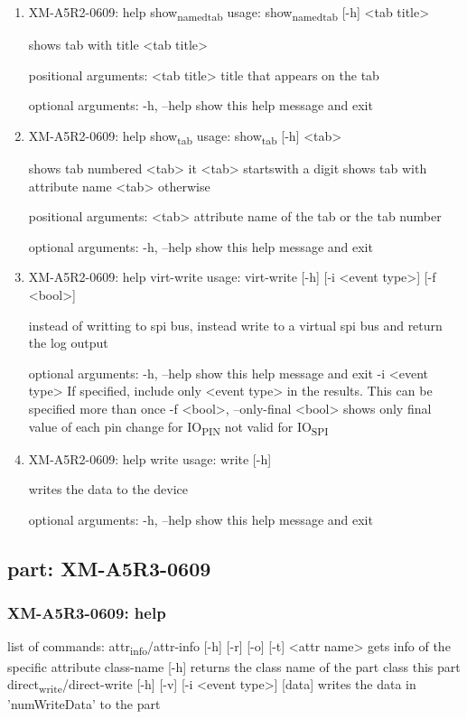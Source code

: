 \documentclass[11pt]{article}
\begin{document}
\begin{enumerate}
\item XM-A5R2-0609: help show\textsubscript{named}\textsubscript{tab}
\label{sec:org7d693f2}
usage: show\textsubscript{named}\textsubscript{tab} [-h] <tab title>

shows tab with title <tab title>

positional arguments:
  <tab title>  title that appears on the tab

optional arguments:
  -h, --help   show this help message and exit

\item XM-A5R2-0609: help show\textsubscript{tab}
\label{sec:orgbf22f62}
usage: show\textsubscript{tab} [-h] <tab>

shows tab numbered <tab> it <tab> startswith a digit shows tab with attribute
name <tab> otherwise

positional arguments:
  <tab>       attribute name of the tab or the tab number

optional arguments:
  -h, --help  show this help message and exit

\item XM-A5R2-0609: help virt-write
\label{sec:orga997b11}
usage: virt-write [-h] [-i <event type>] [-f <bool>]

instead of writting to spi bus, instead write to a virtual spi bus and return
the log output

optional arguments:
  -h, --help            show this help message and exit
  -i <event type>       If specified, include only <event type> in the
                        results. This can be specified more than once
  -f <bool>, --only-final <bool>
                        shows only final value of each pin change for IO\textsubscript{PIN}
                        not valid for IO\textsubscript{SPI}

\item XM-A5R2-0609: help write
\label{sec:orged6607d}
usage: write [-h]

writes the data to the device

optional arguments:
  -h, --help  show this help message and exit
\end{enumerate}

\subsection{part: XM-A5R3-0609}
\label{sec:org9a06320}
\subsubsection{XM-A5R3-0609: help}
\label{sec:orgfc5f6f1}
list of commands:
  attr\textsubscript{info}/attr-info [-h] [-r] [-o] [-t] <attr name>
    gets info of the specific attribute
  class-name [-h]
    returns the class name of the part class this part
  direct\textsubscript{write}/direct-write [-h] [-v] [-i <event type>] [data]
    writes the data in 'numWriteData' to the part
\end{document}
